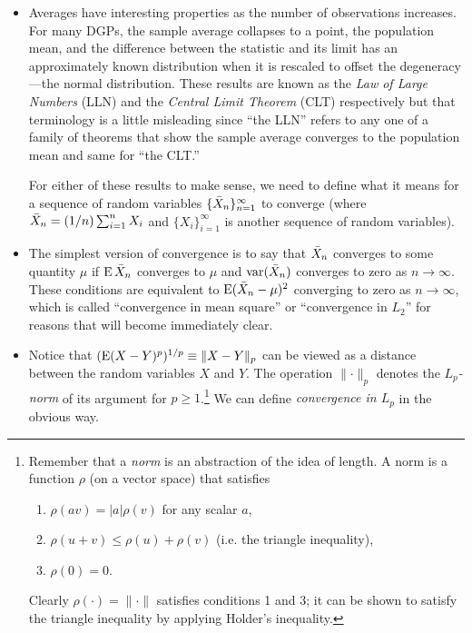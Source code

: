 \begin{itemize}
\item Averages have interesting properties as the number of
  observations increases.  For many DGPs, the sample average collapses
  to a point, the population mean, and the difference between the
  statistic and its limit has an approximately known distribution when
  it is rescaled to offset the degeneracy---the normal distribution.
  These results are known as the \emph{Law of Large Numbers} (LLN) and
  the \emph{Central Limit Theorem} (CLT) respectively but that
  terminology is a little misleading since ``the LLN'' refers to any
  one of a family of theorems that show the sample average converges
  to the population mean and same for ``the CLT.''

  For either of these results to make sense, we need to define what it
  means for a sequence of random variables $\{\bar{X}_n\}_{n=1}^\infty$
  to converge (where $\bar{X}_n = (1/n) \sum_{i=1}^n X_i$ and
  $\{X_i\}_{i=1}^\infty$ is another sequence of random variables).

\item The simplest version of convergence is to say that $\bar{X}_n$
  converges to some quantity $\mu$ if $\operatorname{E} \bar{X}_n$ converges to $\mu$ and
  $\operatorname{var}(\bar{X}_n)$ converges to zero as $n \to \infty$.  These conditions are
  equivalent to $\operatorname{E}(\bar{X}_n - \mu)^2$ converging to zero as $n \to \infty$, which
  is called ``convergence in mean square'' or ``convergence in $L_2$''
  for reasons that will become immediately clear.

\item Notice that $(\operatorname{E}(X - Y)^p)^{1/p} \equiv \lVert X - Y \rVert_p$ can be
  viewed as a distance between the random variables $X$ and $Y$.  The
  operation $\lVert \cdot \rVert_p$ denotes the \emph{$L_p$-norm} of its
  argument for $p \geq 1$.\footnote{Remember that a \emph{norm} is an
    abstraction of the idea of length.  A norm is a function $\rho$ (on
    a vector space) that satisfies
    \begin{enumerate}
    \item $\rho(a v) = |a| \rho(v)$ for any scalar $a$,
    \item $\rho(u + v) \leq \rho(u) + \rho(v)$ (i.e. the triangle inequality),
    \item $\rho(0) = 0$.
    \end{enumerate}
    Clearly $\rho(\cdot) = \lVert \cdot \rVert$ satisfies conditions 1 and 3; it
    can be shown to satisfy the triangle inequality by applying
    Holder's inequality.}
  We can define \emph{convergence in $L_p$} in the obvious way.


\end{itemize}
